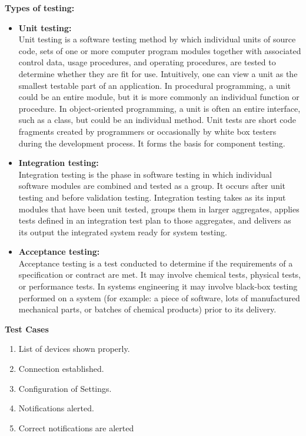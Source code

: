 \documentclass[12pt,a4paper]{report}
\begin{document}
\begin{appendices}
\begin{itemize}
	\textbf{Types of testing:}
	\begin{itemize}
		\item \textbf{Unit testing:}\\
		Unit testing is a software testing method by which individual units of source code, sets of one or more computer program modules together with associated control data, usage procedures, and operating procedures, are tested to determine whether they are fit for use. Intuitively, one can view a unit as the smallest testable part of an application. In procedural programming, a unit could be an entire module, but it is more commonly an individual function or procedure. In object-oriented programming, a unit is often an entire interface, such as a class, but could be an individual method. Unit tests are short code fragments created by programmers or occasionally by white box testers during the development process. It forms the basis for component testing. 
		\item \textbf{Integration testing:}\\
		Integration testing is the phase in software testing in which individual software modules are combined and tested as a group. It occurs after unit testing and before validation testing. Integration testing takes as its input modules that have been unit tested, groups them in larger aggregates, applies tests defined in an integration test plan to those aggregates, and delivers as its output the integrated system ready for system testing.
		\item \textbf{Acceptance testing:}\\
		Acceptance testing is a test conducted to determine if the requirements of a specification or contract are met. It may involve chemical tests, physical tests, or performance tests.
		In systems engineering it may involve black-box testing performed on a system (for example: a piece of software, lots of manufactured mechanical parts, or batches of chemical products) prior to its delivery. 
		
	\end{itemize}
	
	\textbf{Test Cases}
	\begin{enumerate}
		\item List of devices shown properly.
		\item Connection established.
		\item Configuration of Settings.
		\item Notifications alerted.
		\item Correct notifications are alerted
		

\end{enumerate}
\end{itemize}
\end{appendices}
\end{document}
